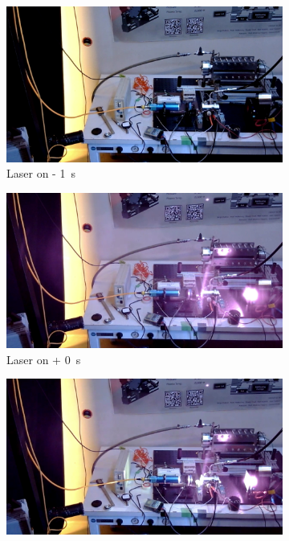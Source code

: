 \begin{figure}[!ht]
    \centering
    \begin{subfigure}[t]{0.45\textwidth}
        \centering
        \includegraphics[width=\textwidth]{assets/4 experiments/CW LSP frames webcam/Before Laser.png}
        \caption{Laser on - \qty{1}{s}}
    \end{subfigure}
    \hfill
    \begin{subfigure}[t]{0.45\textwidth}
        \centering
        \includegraphics[width=\textwidth]{assets/4 experiments/CW LSP frames webcam/Laser on.png}
        \caption{Laser on + \qty{0}{s}}
    \end{subfigure}
    \begin{subfigure}[t]{0.45\textwidth}
        \centering
        \includegraphics[width=\textwidth]{assets/4 experiments/CW LSP frames webcam/LSP initiation.png}

\end{subfigure}
\end{figure}

